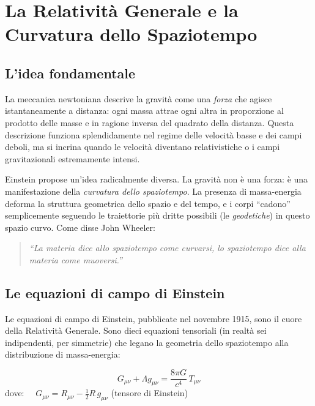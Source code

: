 \documentclass[12pt, a4paper, twoside]{article}
\newenvironment{physbox}[1]{%
  \begin{tcolorbox}[equationbox, title={#1}]
}{%
  \end{tcolorbox}
}
\theoremstyle{definition}
\newcommand{\munu}{{\mu\nu}}
\newcommand{\Gmunu}{G_{\munu}}
\newcommand{\Rmunu}{R_{\munu}}
\newcommand{\Tmunu}{T_{\munu}}
\newcommand{\gmunu}{g_{\munu}}
\begin{document}
\newpage


\section{La Relativit\`a Generale e la Curvatura dello Spaziotempo}

\subsection{L'idea fondamentale}

La meccanica newtoniana descrive la gravità come una \emph{forza} che agisce
istantaneamente a distanza: ogni massa attrae ogni altra in proporzione al
prodotto delle masse e in ragione inversa del quadrato della distanza. Questa
descrizione funziona splendidamente nel regime delle velocità basse e dei campi
deboli, ma si incrina quando le velocità diventano relativistiche o i campi
gravitazionali estremamente intensi.

Einstein propose un'idea radicalmente diversa. La gravità non è una forza:
è una manifestazione della \emph{curvatura dello spaziotempo}. La presenza di
massa-energia deforma la struttura geometrica dello spazio e del tempo, e i
corpi \enquote{cadono} semplicemente seguendo le traiettorie più dritte possibili
(le \emph{geodetiche}) in questo spazio curvo. Come disse John Wheeler:

\begin{quote}
  \itshape
  ``La materia dice allo spaziotempo come curvarsi,
    lo spaziotempo dice alla materia come muoversi.''
\end{quote}

\subsection{Le equazioni di campo di Einstein}

Le equazioni di campo di Einstein, pubblicate nel novembre 1915, sono il cuore
della Relatività Generale. Sono dieci equazioni tensoriali (in realtà sei
indipendenti, per simmetrie) che legano la geometria dello spaziotempo alla
distribuzione di massa-energia:

\begin{physbox}{Equazioni di Campo di Einstein (1915)}
\begin{equation}
  \Gmunu + \Lambda \gmunu = \frac{8\pi G}{c^4}\, \Tmunu
  \label{eq:einstein}
\end{equation}
dove:
$\quad \Gmunu = \Rmunu - \tfrac{1}{2} R\, \gmunu$ \quad (tensore di Einstein)
\end{physbox}
\end{document}
